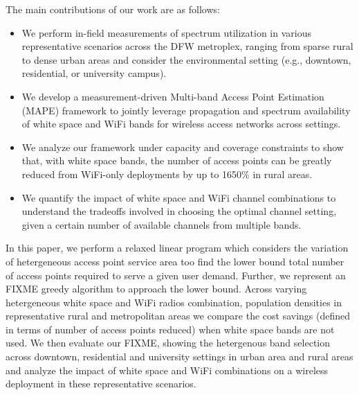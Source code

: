 The main contributions of our work are as follows:
\begin{itemize}
\item We perform in-field measurements of spectrum utilization in various representative
scenarios across the DFW metroplex, ranging from sparse rural to dense urban areas and 
consider the environmental setting (e.g., downtown, residential, or university campus).
\item We develop a measurement-driven Multi-band Access Point Estimation (MAPE) framework 
to jointly leverage propagation and spectrum availability of white space and WiFi bands 
for wireless access networks across settings.
\item We analyze our framework under capacity and coverage constraints 
to show that, with white space bands, the number of access points can be greatly
reduced from WiFi-only deployments by up to 1650\% in rural areas.
\item We quantify the impact of white space and WiFi channel
combinations to understand the tradeoffs involved in choosing the optimal channel setting,
given a certain number of available channels from multiple bands.
\end{itemize}














In this paper, we perform a relaxed linear program which considers the 
variation of hetergeneous access point service area too find the lower bound
total number of access points required to serve a given user demand. Further,
we represent an FIXME greedy algorithm to approach the lower bound.  
Across varying hetergeneous white space and WiFi radios combination, population 
densities in representative rural and metropolitan areas we compare the 
cost savings (defined in terms of number of access points reduced) when 
white space bands are not used. We then evaluate our FIXME, showing
the hetergenous band selection across downtown, residential and university settings in
urban area and rural areas and analyze the impact of white space and WiFi
combinations on a wireless deployment in these representative scenarios.


